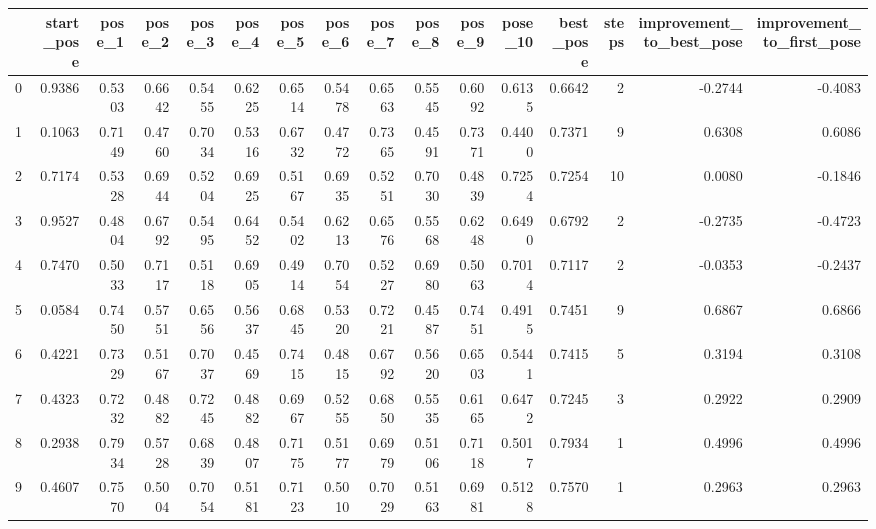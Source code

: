 \begin{tabular}{lrrrrrrrrrrrrrrr}
\toprule
{} &  start\_pose &  pose\_1 &  pose\_2 &  pose\_3 &  pose\_4 &  pose\_5 &  pose\_6 &  pose\_7 &  pose\_8 &  pose\_9 &  pose\_10 &  best\_pose &  steps &  improvement\_to\_best\_pose &  improvement\_to\_first\_pose \\
\midrule
0  &      0.9386 &  0.5303 &  0.6642 &  0.5455 &  0.6225 &  0.6514 &  0.5478 &  0.6563 &  0.5545 &  0.6092 &   0.6135 &     0.6642 &      2 &                   -0.2744 &                    -0.4083 \\
1  &      0.1063 &  0.7149 &  0.4760 &  0.7034 &  0.5316 &  0.6732 &  0.4772 &  0.7365 &  0.4591 &  0.7371 &   0.4400 &     0.7371 &      9 &                    0.6308 &                     0.6086 \\
2  &      0.7174 &  0.5328 &  0.6944 &  0.5204 &  0.6925 &  0.5167 &  0.6935 &  0.5251 &  0.7030 &  0.4839 &   0.7254 &     0.7254 &     10 &                    0.0080 &                    -0.1846 \\
3  &      0.9527 &  0.4804 &  0.6792 &  0.5495 &  0.6452 &  0.5402 &  0.6213 &  0.6576 &  0.5568 &  0.6248 &   0.6490 &     0.6792 &      2 &                   -0.2735 &                    -0.4723 \\
4  &      0.7470 &  0.5033 &  0.7117 &  0.5118 &  0.6905 &  0.4914 &  0.7054 &  0.5227 &  0.6980 &  0.5063 &   0.7014 &     0.7117 &      2 &                   -0.0353 &                    -0.2437 \\
5  &      0.0584 &  0.7450 &  0.5751 &  0.6556 &  0.5637 &  0.6845 &  0.5320 &  0.7221 &  0.4587 &  0.7451 &   0.4915 &     0.7451 &      9 &                    0.6867 &                     0.6866 \\
6  &      0.4221 &  0.7329 &  0.5167 &  0.7037 &  0.4569 &  0.7415 &  0.4815 &  0.6792 &  0.5620 &  0.6503 &   0.5441 &     0.7415 &      5 &                    0.3194 &                     0.3108 \\
7  &      0.4323 &  0.7232 &  0.4882 &  0.7245 &  0.4882 &  0.6967 &  0.5255 &  0.6850 &  0.5535 &  0.6165 &   0.6472 &     0.7245 &      3 &                    0.2922 &                     0.2909 \\
8  &      0.2938 &  0.7934 &  0.5728 &  0.6839 &  0.4807 &  0.7175 &  0.5177 &  0.6979 &  0.5106 &  0.7118 &   0.5017 &     0.7934 &      1 &                    0.4996 &                     0.4996 \\
9  &      0.4607 &  0.7570 &  0.5004 &  0.7054 &  0.5181 &  0.7123 &  0.5010 &  0.7029 &  0.5163 &  0.6981 &   0.5128 &     0.7570 &      1 &                    0.2963 &                     0.2963 \\

\end{tabular}
